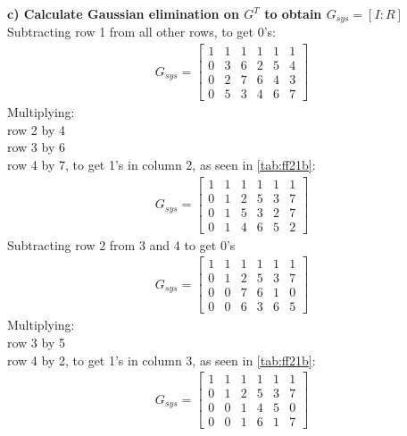 \noindent\textbf{c) Calculate Gaussian elimination on $G^T$ to obtain $G_{sys} = [I : R]$}\\
Subtracting row 1 from all other rows, to get 0's: \\
\begin{align}
    G_{sys} = 
    \begin{bmatrix}
        1 & 1 & 1 & 1 & 1 & 1 \\
        0 & 3 & 6 & 2 & 5 & 4 \\
        0 & 2 & 7 & 6 & 4 & 3 \\
        0 & 5 & 3 & 4 & 6 & 7 
    \end{bmatrix}
\end{align}
Multiplying: \\row 2 by 4 \\row 3 by 6 \\row 4 by 7, to get 1's in column 2, as seen in \ref{tab:ff21b}: \\
\begin{align}
    G_{sys} = 
    \begin{bmatrix}
        1 & 1 & 1 & 1 & 1 & 1 \\
        0 & 1 & 2 & 5 & 3 & 7 \\
        0 & 1 & 5 & 3 & 2 & 7 \\
        0 & 1 & 4 & 6 & 5 & 2 
    \end{bmatrix}
\end{align}
Subtracting row 2 from 3 and 4 to get 0's \\
\begin{align}
    G_{sys} = 
    \begin{bmatrix}
        1 & 1 & 1 & 1 & 1 & 1 \\
        0 & 1 & 2 & 5 & 3 & 7 \\
        0 & 0 & 7 & 6 & 1 & 0 \\
        0 & 0 & 6 & 3 & 6 & 5 
    \end{bmatrix}
\end{align}
Multiplying: \\row 3 by 5 \\row 4 by 2, to get 1's in column 3, as seen in \ref{tab:ff21b}: \\
\begin{align}
    G_{sys} = 
    \begin{bmatrix}
        1 & 1 & 1 & 1 & 1 & 1 \\
        0 & 1 & 2 & 5 & 3 & 7 \\
        0 & 0 & 1 & 4 & 5 & 0 \\
        0 & 0 & 1 & 6 & 1 & 7 
    \end{bmatrix}
\end{align}
